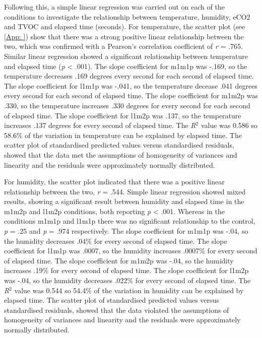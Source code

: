 \documentclass{ueacmpstyle}
\begin{document}
        
        
        Following this, a simple linear regression was carried out on each of the conditions to investigate the relationship between temperature, humidity, eCO2 and TVOC and elapsed time (seconds). For temperature, the scatter plot (see \ref{App: }) show that there was a strong positive linear relationship between the two, which was confirmed with a Pearson's correlation coefficient of \textit{r} = .765. Similar linear regression showed a significant relationship between temperature and elapsed time (\textit{p} < .001). The slope coefficient for m1m1p was -.169, so the temperature decreases .169 degrees every second for each second of elapsed time. The slope coefficient for l1m1p was -.041, so the temperature decease .041 degrees every second for each second of elapsed time. The slope coefficient for m1m2p was .330, so the temperature increases .330 degrees for every second for each second of elapsed time. The slope coefficient for l1m2p was .137, so the temperature increases .137 degrees for every second of elapsed time. The \textit{R$^2$} value was 0.586 so 58.6\% of the variation in temperature can be explained by elapsed time. The scatter plot of standardised predicted values versus standardised residuals, showed that the data met the assumptions of homogeneity of variances and linearity and the residuals were approximately normally distributed. 

        
        For humidity, the scatter plot indicated that there was a positive linear relationship between the two, \textit{r} = .544. Simple linear regression showed mixed results, showing a significant result between humidity and elapsed time in the m1m2p and l1m2p conditions, both reporting \textit{p} < .001. Whereas in the conditions m1m1p and l1m1p there was no significant relationship to the control, \textit{p} = .25 and \textit{p} = .974 respectively. The slope coefficient for m1m1p was -.04, so the humidity decreases .04\% for every second of elapsed time. The slope coefficient for l1m1p was .0007, so the humidity increases .0007\% for every second of elapsed time. The slope coefficient for m1m2p was -.04, so the humidity increases .19\% for every second of elapsed time. The slope coefficient for l1m2p was -.04, so the humidity decreases .022\% for every second of elapsed time. The \textit{R$^2$} value was 0.544 so 54.4\% of the variation in humidity can be explained by elapsed time. The scatter plot of standardised predicted values versus standardised residuals, showed that the data violated the assumptions of homogeneity of variances and linearity and the residuals were approximately normally distributed. 
\end{document}
